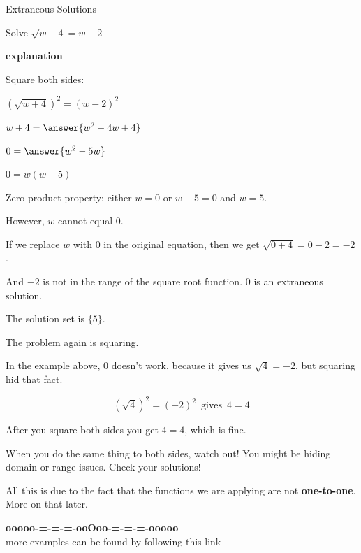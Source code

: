 \documentclass{ximera}
\begin{document}
\begin{example} Extraneous Solutions

Solve $\sqrt{w+4} = w - 2$


\textbf{\textcolor{red!75!green}{explanation}} 

Square both sides:



$(\sqrt{w+4})^2 = (w - 2)^2$


$w + 4 = \answer{w^2 - 4w + 4}$


$0 = \answer{w^2 - 5w}$

$0 = w(w-5) $


Zero product property:  either $w=0$ or $w-5=0$ and $w=5$.



However, $w$ cannot equal $0$.  

If we replace $w$ with $0$ in the original equation, then we get $\sqrt{0+4} = 0 - 2 = -2$.

And $-2$ is not in the range of the square root function. $0$ is an extraneous solution.

The solution set is $\{ 5 \}$.



\end{example}


The problem again is squaring.

In the example above, $0$ doesn't work, because it gives us $\sqrt{4} = -2$, but squaring hid that fact.  


\[ (\sqrt{4})^2 = (-2)^2 \, \text{ gives } \, 4 = 4\]


After you square both sides you get $4 = 4$, which is fine.





When you do the same thing to both sides, watch out!  You might be hiding domain or range issues.  Check your solutions! 




All this is due to the fact that the functions we are applying are not \textbf{one-to-one}.  More on that later.












\begin{onlineOnly}
\begin{center}
\textbf{\textcolor{green!50!black}{ooooo-=-=-=-ooOoo-=-=-=-ooooo}} \\

more examples can be found by following this link\\ 

\end{center}
\end{onlineOnly}
\end{document}
